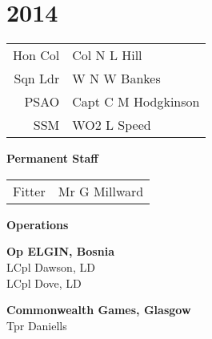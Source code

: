 \chapter*{2014}

\vspace*{20mm}

\begin{center}
  \begin{tabular}{rl}
    Hon Col & Col N L Hill \\
    Sqn Ldr & W N W Bankes \\
    PSAO & Capt C M Hodgkinson \\
    SSM & WO2 L Speed \\
  \end{tabular}
\end{center}

\begin{center}
  \Large
  \textbf{Permanent Staff}
\end{center}

\begin{center}
  \begin{tabular}{rl}
    Fitter & Mr G Millward \\
  \end{tabular}
\end{center}

\vspace*{20mm}

\begin{center}
  \Large
  \textbf{Operations}
\end{center}

\begin{multicols}{2}
  \noindent
  \textbf{Op ELGIN, Bosnia} \\
  LCpl Dawson, LD \\
  LCpl Dove, LD \\
  
  \columnbreak
  
  \noindent
  \textbf{Commonwealth Games, Glasgow} \\
  Tpr Daniells \\
\end{multicols}

